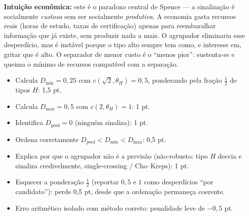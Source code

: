 \begin{solucao}
\textbf{Intui\c{c}\~ao econ\^omica:} este \'e o paradoxo central de Spence --- a sinaliza\c{c}\~ao \'e socialmente \emph{custosa} sem ser socialmente \emph{produtiva}. A economia gasta recursos reais (horas de estudo, taxas de certifica\c{c}\~ao) apenas para reembaralhar informa\c{c}\~ao que j\'a existe, sem produzir nada a mais. O agrupador eliminaria esse desperd\'icio, mas \'e inst\'avel porque o tipo alto sempre tem como, e interesse em, gritar que \'e alto. O separador de menor custo \'e o ``menos pior'': sustenta-se e queima o m\'inimo de recursos compat\'ivel com a separa\c{c}\~ao.
\rubricalabel
\begin{itemize}
\item Calcula $D_{\min}=0{,}25$ com $c(\sqrt{2},\theta_H)=0{,}5$, ponderando pela fra\c{c}\~ao $\tfrac12$ de tipos $H$: 1{,}5 pt.
\item Calcula $D_{\max}=0{,}5$ com $c(2,\theta_H)=1$: 1 pt.
\item Identifica $D_{\text{pool}}=0$ (ningu\'em sinaliza): 1 pt.
\item Ordena corretamente $D_{\text{pool}}<D_{\min}<D_{\max}$: 0{,}5 pt.
\item Explica por que o agrupador n\~ao \'e a previs\~ao (n\~ao-robusto: tipo $H$ desvia e sinaliza credivelmente, single-crossing / Cho--Kreps): 1 pt.
\item Esquecer a pondera\c{c}\~ao $\tfrac12$ (reportar $0{,}5$ e $1$ como desperd\'icios ``por candidato''): perde 0{,}5 pt, desde que a ordena\c{c}\~ao permane\c{c}a coerente.
\item Erro aritm\'etico isolado com m\'etodo correto: penalidade leve de $-0{,}5$ pt.
\end{itemize}
\end{solucao}
